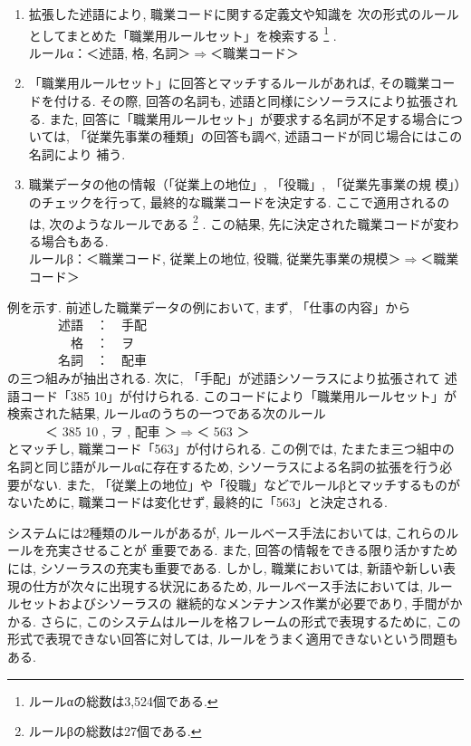 \documentclass{nlp}
\begin{document}
\begin{enumerate}
\item 拡張した述語により, 職業コードに関する定義文や知識を
次の形式のルールとしてまとめた「職業用ルールセット」を検索する
\footnote{ルールαの総数は3,524個である. }
.
\vspace{2mm}\\
ルールα：＜述語, 格, 名詞＞$\Rightarrow$＜職業コード＞
\vspace{2mm}  
\item 「職業用ルールセット」に回答とマッチするルールがあれば, その職業コードを付ける. 
その際, 回答の名詞も, 述語と同様にシソーラスにより拡張される. 
また, 回答に「職業用ルールセット」が要求する名詞が不足する場合については, 
「従業先事業の種類」の回答も調べ, 述語コードが同じ場合にはこの名詞により
      補う. 
\item 職業データの他の情報（「従業上の地位」, 「役職」, 「従業先事業の規
      模」）のチェックを行って, 最終的な職業コードを決定する. 
ここで適用されるのは, 次のようなルールである
\footnote{ルールβの総数は27個である. }
. この結果, 先に決定された職業コードが変わる場合もある. 
\vspace{2mm}\\
ルールβ：＜職業コード, 従業上の地位, 役職, 従業先事業の規模＞$\Rightarrow$＜職業コード＞
\vspace{2mm} 
\end{enumerate}

例を示す. 
前述した職業データの例において, まず, 「仕事の内容」から\\ 
　　　　述語　：　手配\\
　　　　　格　：　ヲ\\
　　　　名詞　：　配車\\
の三つ組みが抽出される. 
次に, 「手配」が述語シソーラスにより拡張されて
述語コード「385 10」が付けられる. 
このコードにより「職業用ルールセット」が検索された結果, 
ルールαのうちの一つである次のルール
\vspace{2mm}\\
　　　＜ 385 10 , ヲ , 配車 ＞$\Rightarrow$＜ 563 ＞
\vspace{2mm}\\
とマッチし, 
職業コード「563」が付けられる. 
この例では, 
たまたま三つ組中の名詞と同じ語がルールαに存在するため, 
シソーラスによる名詞の拡張を行う必要がない. 
また, 
「従業上の地位」や「役職」などでルールβとマッチするものがないために, 
職業コードは変化せず, 
最終的に「563」と決定される. 

システムには2種類のルールがあるが,  
ルールベース手法においては, これらのルールを充実させることが
重要である. 
また, 回答の情報をできる限り活かすためには, シソーラスの充実も重要である. 
しかし, 
職業においては, 
新語や新しい表現の仕方が次々に出現する状況にあるため, 
ルールベース手法においては, ルールセットおよびシソーラスの
継続的なメンテナンス作業が必要であり, 手間がかかる. 
さらに, このシステムはルールを格フレームの形式で表現するために, 
この形式で表現できない回答に対しては, 
ルールをうまく適用できないという問題もある. 
\end{document}
